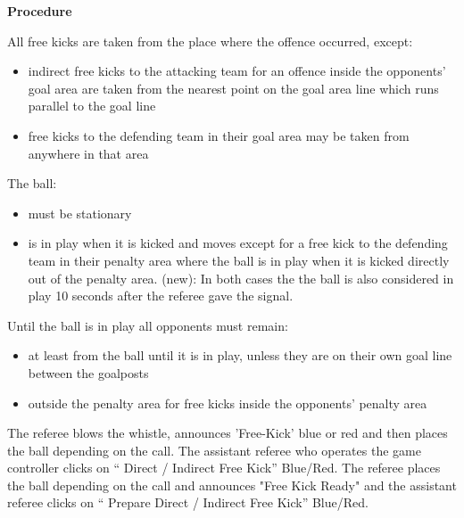 {\bfseries Procedure}

\headlinebox


All free kicks are taken from the place where the offence occurred, except:
\begin{itemize}
\item indirect free kicks to the attacking team for an offence inside the opponents' goal area are taken from the nearest point on the goal area line which runs parallel to the goal line
\item free kicks to the defending team in their goal area may be taken from anywhere in that area
\end{itemize}

The ball:
\begin{itemize}
\item must be stationary 
\item is in play when it is kicked and  moves   except for a free kick to the defending team in their penalty area where the ball is in play when it is kicked directly out of the penalty area. (new): In both cases the the ball is also considered in play 10 seconds after the referee gave the signal.
\end{itemize}

Until the ball is in play all opponents must remain:
\begin{itemize}
\item at least    from the ball until it is in play, unless they are on their own goal line between the goalposts 
\item outside the penalty area for free kicks inside the opponents' penalty area
\end{itemize}

The referee blows the whistle, announces 'Free-Kick' blue or red and then places the ball depending on the call. The assistant referee who operates the game controller clicks on `` Direct / Indirect Free Kick'' Blue/Red.  The referee places the ball depending on the call and announces "Free Kick Ready" and the assistant referee clicks on `` Prepare Direct / Indirect Free Kick'' Blue/Red. 

